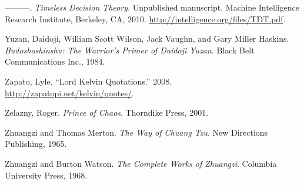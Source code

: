 \documentclass[letterpaper]{book}
\begin{document}
{
 {}---{}---{}---. \textit{Timeless Decision Theory}. Unpublished
manuscript. Machine Intelligence Research Institute, Berkeley, CA,
2010. \url{http://intelligence.org/files/TDT.pdf}.}

{
 Yuzan, Daidoji, William Scott Wilson, Jack Vaughn, and Gary Miller
Haskins. \textit{Budoshoshinshu: The Warrior's Primer
of Daidoji Yuzan}. Black Belt Communications Inc., 1984.}

{
 Zapato, Lyle. ``Lord Kelvin
Quotations.'' 2008.
\url{http://zapatopi.net/kelvin/quotes/}.}

{
 Zelazny, Roger. \textit{Prince of Chaos}. Thorndike Press, 2001.}

{
 Zhuangzi and Thomas Merton. \textit{The Way of Chuang Tzu}. New
Directions Publishing, 1965.}

{
 Zhuangzi and Burton Watson. \textit{The Complete Works of
Zhuangzi}. Columbia University Press, 1968.}


\bigskip


\bigskip

\clearpage
\bigskip
\end{document}
